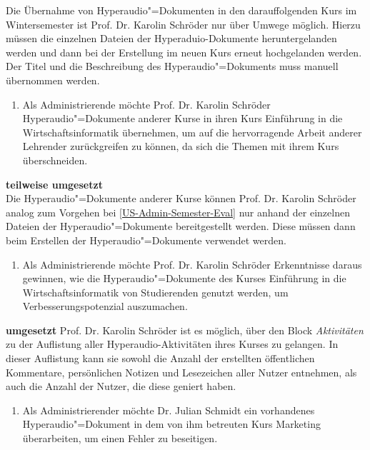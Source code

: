 Die Übernahme von Hyperaudio"=Dokumenten in den darauffolgenden Kurs im Wintersemester ist Prof. Dr. Karolin Schröder nur über Umwege möglich. Hierzu müssen die einzelnen Dateien der Hyperaduio-Dokumente heruntergelanden werden und dann bei der Erstellung im neuen Kurs erneut hochgelanden werden. Der Titel und die Beschreibung des Hyperaudio"=Dokuments muss manuell übernommen werden.
\vspace{0.25cm}
\begin{enumerate}[resume*]
\item \label{US-Admin-Kurs-Eval} Als Administrierende möchte Prof. Dr. Karolin Schröder Hyperaudio"=Dokumente anderer Kurse in ihren Kurs \glqq Einführung in die Wirtschaftsinformatik\grqq{} übernehmen, um auf die hervorragende Arbeit anderer Lehrender zurückgreifen zu können, da sich die Themen mit ihrem Kurs überschneiden.
\end{enumerate}
\vspace{-0.1cm}
\textbf{teilweise umgesetzt}\\
Die Hyperaudio"=Dokumente anderer Kurse können Prof. Dr. Karolin Schröder analog zum Vorgehen bei \ref{US-Admin-Semester-Eval} nur anhand der einzelnen Dateien der Hyperaudio"=Dokumente bereitgestellt werden. Diese müssen dann beim Erstellen der Hyperaudio"=Dokumente verwendet werden.
\vspace{0.25cm}
\begin{enumerate}[resume*]
\item \label{US-Admin-Statistik-Eval} Als Administrierende möchte Prof. Dr. Karolin Schröder Erkenntnisse daraus gewinnen, wie die Hyperaudio"=Dokumente des Kurses \glqq Einführung in die Wirtschaftsinformatik\grqq{} von Studierenden genutzt werden, um Verbesserungspotenzial auszumachen.
\end{enumerate}
\vspace{-0.1cm}
\textbf{umgesetzt}
Prof. Dr. Karolin Schröder ist es möglich, über den Block \textit{Aktivitäten} zu der Auflistung aller Hyperaudio-Aktivitäten ihres Kurses zu gelangen. In dieser Auflistung kann sie sowohl die Anzahl der erstellten öffentlichen Kommentare, persönlichen Notizen und Lesezeichen aller Nutzer entnehmen, als auch die Anzahl der Nutzer, die diese geniert haben.
\vspace{0.25cm}
\begin{enumerate}[resume*]
\item \label{US-Admin-Bearbeiten-Eval} Als Administrierender möchte Dr. Julian Schmidt ein vorhandenes Hyperaudio"=Dokument in dem von ihm betreuten Kurs \glqq Marketing\grqq{} überarbeiten, um einen Fehler zu beseitigen.
\end{enumerate}
